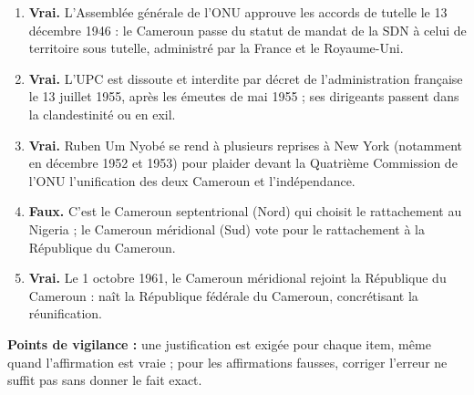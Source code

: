 \documentclass[11pt]{article}
\newcommand{\cle}[1]{{\popxbold\color{popdark}#1}}
\begin{document}
\begin{corrige}
\begin{enumerate}
\item \textbf{Vrai.} L'Assemblée générale de l'ONU approuve les accords de tutelle le 13 décembre 1946 : le Cameroun passe du statut de mandat de la SDN à celui de territoire sous tutelle, administré par la France et le Royaume-Uni.
\item \textbf{Vrai.} L'UPC est dissoute et interdite par décret de l'administration française le 13 juillet 1955, après les émeutes de mai 1955 ; ses dirigeants passent dans la clandestinité ou en exil.
\item \textbf{Vrai.} \cle{Ruben Um Nyobé} se rend à plusieurs reprises à New York (notamment en décembre 1952 et 1953) pour plaider devant la Quatrième Commission de l'ONU l'unification des deux Cameroun et l'indépendance.
\item \textbf{Faux.} C'est le Cameroun septentrional (Nord) qui choisit le rattachement au Nigeria ; le Cameroun méridional (Sud) vote pour le rattachement à la République du Cameroun.
\item \textbf{Vrai.} Le 1\ier{} octobre 1961, le Cameroun méridional rejoint la République du Cameroun : naît la République fédérale du Cameroun, concrétisant la \cle{réunification}.
\end{enumerate}
\textbf{Points de vigilance :} une justification est exigée pour chaque item, même quand l'affirmation est vraie ; pour les affirmations fausses, corriger l'erreur ne suffit pas sans donner le fait exact.
\end{corrige}
\end{document}
